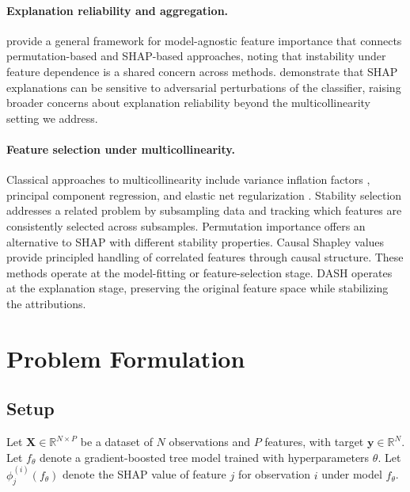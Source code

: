\documentclass[11pt]{article}
\newcommand{\dash}{\textsc{DASH}}
\begin{document}
\paragraph{Explanation reliability and aggregation.}
\citet{molnar2022general} provide a general framework for model-agnostic
feature importance that connects permutation-based and SHAP-based
approaches, noting that instability under feature dependence is a shared
concern across methods. \citet{slack2020fooling} demonstrate that
SHAP explanations can be sensitive to adversarial perturbations of the
classifier, raising broader concerns about explanation reliability
beyond the multicollinearity setting we address.

\paragraph{Feature selection under multicollinearity.}
Classical approaches to multicollinearity include variance inflation
factors \citep{obrien2007caution}, principal component regression, and
elastic net regularization \citep{zou2005regularization}. Stability
selection \citep{meinshausen2010stability} addresses a related problem
by subsampling data and tracking which features are consistently
selected across subsamples. Permutation importance
\citep{altmann2010permutation} offers an alternative to SHAP with
different stability properties. Causal Shapley values
\citep{heskes2020causal} provide principled handling of correlated
features through causal structure. These methods operate at the
model-fitting or feature-selection stage. \dash{} operates at the
explanation stage, preserving the original feature space while
stabilizing the attributions.


\section{Problem Formulation}
\label{sec:problem}

\subsection{Setup}

Let $\mathbf{X} \in \mathbb{R}^{N \times P}$ be a dataset of $N$
observations and $P$ features, with target $\mathbf{y} \in \mathbb{R}^N$.
Let $f_\theta$ denote a gradient-boosted tree model trained with
hyperparameters $\theta$. Let $\phi_j^{(i)}(f_\theta)$ denote the SHAP
value of feature $j$ for observation $i$ under model $f_\theta$.
\end{document}
